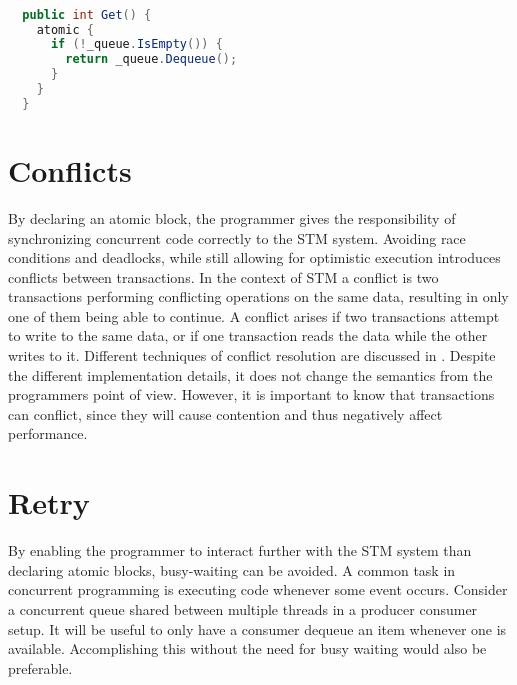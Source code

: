 \begin{lstlisting}[label=lst:stm_atomic_block,
  caption={Threadsafe queue},
  language=Java,  
  showspaces=false,
  showtabs=false,
  breaklines=true,
  showstringspaces=false,
  breakatwhitespace=true,
  commentstyle=\color{greencomments},
  keywordstyle=\color{bluekeywords},
  stringstyle=\color{redstrings},
  morekeywords={atomic, retry, orElse}]  % Start your code-block

  public int Get() { 
    atomic {
      if (!_queue.IsEmpty()) {
        return _queue.Dequeue();
      }
    }
  }
\end{lstlisting}

\section{Conflicts}
By declaring an atomic block, the programmer gives the responsibility of synchronizing concurrent code correctly to the \ac{STM} system. Avoiding race conditions and deadlocks, while still allowing for optimistic execution introduces conflicts between transactions. In the context of \ac{STM} a conflict is two transactions performing conflicting operations on the same data, resulting in only one of them being able to continue\cite[p. 20]{harris2010transactional}. A conflict arises if two transactions attempt to write to the same data, or if one transaction reads the data while the other writes to it. Different techniques of conflict resolution are discussed in \cite[p. 45-46 \& 52-55]{dpt907e14trending}. Despite the different implementation details, it does not change the semantics from the programmers point of view. However, it is important to know that transactions can conflict, since they will cause contention and thus negatively affect performance.

\section{Retry}
By enabling the programmer to interact further with the \ac{STM} system than declaring atomic blocks, busy-waiting can be avoided. A common task in concurrent programming is executing code whenever some event occurs. Consider a concurrent queue shared between multiple threads in a producer consumer setup. It will be useful to only have a consumer dequeue an item whenever one is available. Accomplishing this without the need for busy waiting would also be preferable.

